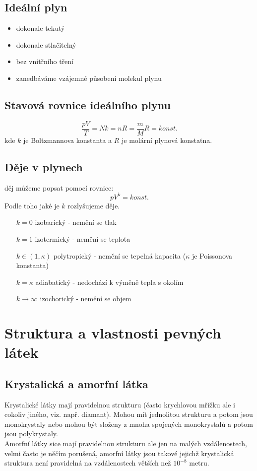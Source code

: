 \documentclass[titlepage]{report}
\begin{document}
\section{Ideální plyn}
\begin{itemize}
\item dokonale tekutý
\item dokonale stlačitelný
\item bez vnitřního tření
\item zanedbáváme vzájemné působení molekul plynu
\end{itemize}
\section{Stavová rovnice ideálního plynu}
\begin{equation}
\frac{pV}{T} = Nk = nR = \frac{m}{M}R = konst.
\end{equation}
kde $k$ je Boltzmannova konstanta a $R$ je molární plynová konstatna.
\section{Děje v plynech}
děj můžeme popsat pomocí rovnice:\\
\begin{equation}
pV^k = konst.
\end{equation}
Podle toho jaké je $k$ rozlyšujeme děje.\\
\begin{itemize}
\item[$k=0$] izobarický - nemění se tlak
\item[$k=1$] izotermický - nemění se teplota
\item[$k \in (1, \kappa)$] polytropický - nemění se tepelná kapacita ($\kappa$ je Poissonova konstanta)
\item[$k=\kappa$] adiabatický - nedochází k výměně tepla s okolím
\item[$k \rightarrow \infty$] izochorický - nemění se objem
\end{itemize}
\chapter{Struktura a vlastnosti pevných látek}
\section{Krystalická a amorfní látka}
Krystalické látky mají pravidelnou strukturu (často krychlovou mřížku ale i cokoliv jiného, viz. např. diamant). Mohou mít jednolitou strukturu a potom jsou monokrystaly nebo mohou být složeny z mnoha spojených monokrystalů a potom jsou polykrystaly.\\
Amorfní látky sice mají pravidelnou strukturu ale jen na malých vzdálenostech, velmi často je něčím porušená, amorfní látky jsou takové jejichž krystalická struktura není pravidelná na vzdálenostech větších než $10^{-8}$ metru.
\end{document}
